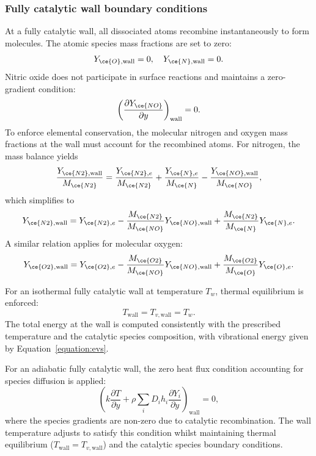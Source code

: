 \subsubsection{Fully catalytic wall boundary conditions}

At a fully catalytic wall, all dissociated atoms recombine instantaneously to form molecules. The atomic species mass fractions are set to zero:
\begin{equation}
Y_{\ce{O},\text{wall}} = 0, \quad Y_{\ce{N},\text{wall}} = 0.
\end{equation}
Nitric oxide does not participate in surface reactions and maintains a zero-gradient condition:
\begin{equation}
\left( \frac{\partial Y_{\ce{NO}}}{\partial y} \right)_{\text{wall}} = 0.
\end{equation}
To enforce elemental conservation, the molecular nitrogen and oxygen mass fractions at the wall must account for the recombined atoms. For nitrogen, the mass balance yields
\begin{equation}
\frac{Y_{\ce{N2},\text{wall}}}{M_{\ce{N2}}} = \frac{Y_{\ce{N2},e}}{M_{\ce{N2}}} + \frac{Y_{\ce{N},e}}{M_{\ce{N}}} - \frac{Y_{\ce{NO},\text{wall}}}{M_{\ce{NO}}},
\end{equation}
which simplifies to
\begin{equation}
Y_{\ce{N2},\text{wall}} = Y_{\ce{N2},e} - \frac{M_{\ce{N2}}}{M_{\ce{NO}}} Y_{\ce{NO},\text{wall}} + \frac{M_{\ce{N2}}}{M_{\ce{N}}} Y_{\ce{N},e}.
\end{equation}
A similar relation applies for molecular oxygen:
\begin{equation}
Y_{\ce{O2},\text{wall}} = Y_{\ce{O2},e} - \frac{M_{\ce{O2}}}{M_{\ce{NO}}} Y_{\ce{NO},\text{wall}} + \frac{M_{\ce{O2}}}{M_{\ce{O}}} Y_{\ce{O},e}.
\end{equation}

For an isothermal fully catalytic wall at temperature $T_w$, thermal equilibrium is enforced:
\begin{equation}
T_{\text{wall}} = T_{v,\text{wall}} = T_w.
\end{equation}
The total energy at the wall is computed consistently with the prescribed temperature and the catalytic species composition, with vibrational energy given by Equation~\eqref{equation:evs}.

For an adiabatic fully catalytic wall, the zero heat flux condition accounting for species diffusion is applied:
\begin{equation}
\left( k \frac{\partial T}{\partial y} + \rho \sum_i D_i h_i \frac{\partial Y_i}{\partial y} \right)_{\text{wall}} = 0,
\end{equation}
where the species gradients are non-zero due to catalytic recombination. The wall temperature adjusts to satisfy this condition whilst maintaining thermal equilibrium ($T_{\text{wall}} = T_{v,\text{wall}}$) and the catalytic species boundary conditions.




